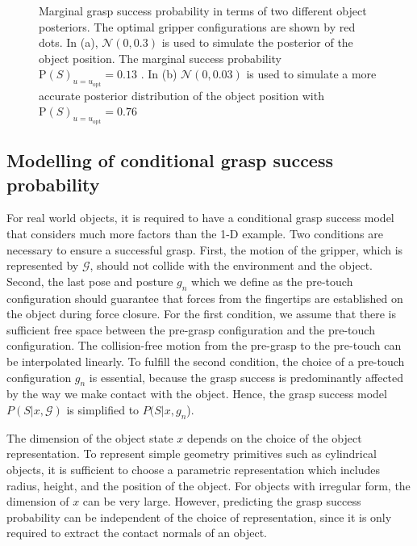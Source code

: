\begin{figure}[!htbp]
\centering
\def\svgwidth{1\linewidth}

\caption{ Marginal grasp success probability in terms of two different object posteriors. The optimal gripper configurations are shown by red dots. In (a), $\mathcal{N}(0, 0.3)$ is used to simulate the posterior of the object position. The marginal success probability ${\text{P}(S)}_{u = u_{\text{opt}}} = 0.13$  . In (b) $\mathcal{N}(0, 0.03)$ is used to simulate a more accurate posterior distribution of the object position with ${\text{P}(S)}_{u = u_{\text{opt}}} = 0.76$ }
\label{fig:1D_grasp}
\end{figure}	 


\subsection{Modelling of conditional grasp success probability } \label{sec:grasp_success_model}
For real world objects, it is required to have a conditional grasp success model that considers much more factors than the 1-D example. Two conditions are necessary to ensure a successful grasp. First, the motion of the gripper, which is represented by $\mathcal{G}$, should not collide with the environment and the object. Second, the last pose and posture $g_n$ which we define as the pre-touch configuration should guarantee that forces from the fingertips are established on the object during force closure. For the first condition, we assume that there is sufficient free space between the pre-grasp configuration and the pre-touch configuration. The collision-free motion from the pre-grasp to the pre-touch can be interpolated linearly. To fulfill the second condition, the choice of a pre-touch configuration $g_n$ is essential, because the grasp success is predominantly affected by the way we make contact with the object. Hence, the grasp success model $P(S | x,\mathcal{G})$ is simplified to $P(S | x, g_n$). 

The dimension of the object state $x$ depends on the choice of the object representation. To represent simple geometry primitives such as cylindrical objects, it is sufficient to choose a parametric representation which includes radius, height, and the position of the object. For objects with irregular form, the dimension of $x$ can be very large. However, predicting the grasp success probability can be independent of the choice of representation, since it is only required to extract the contact normals of an object.  

